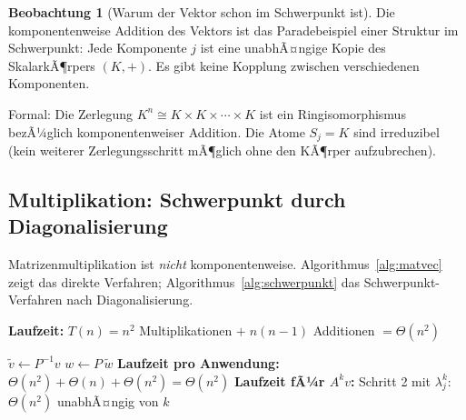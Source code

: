 ﻿\documentclass[a4paper,12pt]{report}
\theoremstyle{definition}
\newtheorem{beobachtung}{Beobachtung}
\begin{document}
\begin{beobachtung}[Warum der Vektor schon im Schwerpunkt ist]
    Die komponentenweise Addition des Vektors ist das Paradebeispiel
    einer Struktur im Schwerpunkt: Jede Komponente $j$ ist eine
    unabhÃ¤ngige Kopie des SkalarkÃ¶rpers $(K, +)$. Es gibt keine
    Kopplung zwischen verschiedenen Komponenten.

    Formal: Die Zerlegung $K^n \cong K \times K \times \cdots \times K$
    ist ein Ringisomorphismus bezÃ¼glich komponentenweiser Addition.
    Die Atome $S_j = K$ sind irreduzibel (kein weiterer Zerlegungsschritt
    mÃ¶glich ohne den KÃ¶rper aufzubrechen).
\end{beobachtung}

\subsection*{Multiplikation: Schwerpunkt durch Diagonalisierung}

Matrizenmultiplikation ist \emph{nicht} komponentenweise. Algorithmus~\ref{alg:matvec} zeigt das direkte Verfahren; Algorithmus~\ref{alg:schwerpunkt} das Schwerpunkt-Verfahren nach Diagonalisierung.


\begin{algorithm}[H]
\DontPrintSemicolon
\caption{Matrix-Vektor-Produkt (direkt)}\label{alg:matvec}
\;
\BlankLine
\textbf{Laufzeit:} $T(n) = n^2$ Multiplikationen $+\; n(n-1)$ Additionen $= \Theta(n^2)$
\end{algorithm}

\begin{algorithm}[H]
\DontPrintSemicolon
\caption{Matrix-Vektor-Produkt im Schwerpunkt}\label{alg:schwerpunkt}
$\tilde{v} \leftarrow P^{-1} v$ 
\BlankLine
{}
\BlankLine
{}
$w \leftarrow P\, \tilde{w}$ 
\;
\BlankLine
\textbf{Laufzeit pro Anwendung:} $\Theta(n^2) + \Theta(n) + \Theta(n^2) = \Theta(n^2)$\;
\textbf{Laufzeit fÃ¼r $A^k v$:} Schritt 2 mit $\lambda_j^k$: $\Theta(n^2)$ unabhÃ¤ngig von $k$
\end{algorithm}
\end{document}
